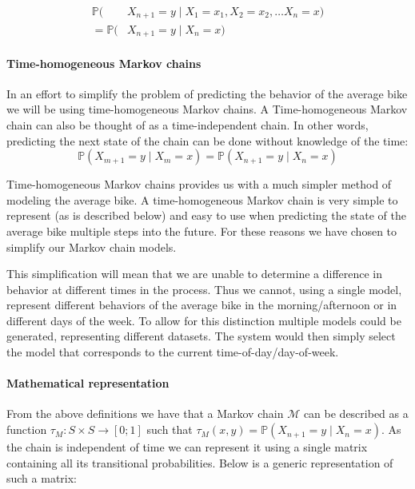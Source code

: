 \begin{align}\label{markov:eq:markov_prob}
\mathbb{P}(&X_{n+1} = y \mid X_1 = x_1, X_2 = x_2, \dots X_n = x)\nonumber\\
= \mathbb{P}(&X_{n+1} = y \mid X_n = x)
\end{align}

\paragraph{Time-homogeneous Markov chains}
In an effort to simplify the problem of predicting the behavior of the average bike we will be using time-homogeneous Markov chains.
A Time-homogeneous Markov chain can also be thought of as a time-independent chain.
In other words, predicting the next state of the chain can be done without knowledge of the time:
\begin{equation}
\mathbb{P}(X_{m+1} = y \mid X_m = x) = \mathbb{P}(X_{n+1} = y \mid X_n = x)
\end{equation}

Time-homogeneous Markov chains provides us with a much simpler method of modeling the average bike.
A time-homogeneous Markov chain is very simple to represent (as is described below) and easy to use when predicting the state of the average bike multiple steps into the future.
For these reasons we have chosen to simplify our Markov chain models.

This simplification will mean that we are unable to determine a difference in behavior at different times in the process.
Thus we cannot, using a single model, represent different behaviors of the average bike in the morning/afternoon or in different days of the week.
To allow for this distinction multiple models could be generated, representing different datasets.
The system would then simply select the model that corresponds to the current time-of-day/day-of-week.

\paragraph{Mathematical representation}\label{markov:math}
From the above definitions we have that a Markov chain $\mathcal{M}$ can be described as a function $\tau_M:S\times S \rightarrow [0;1]$ such that $\tau_M(x, y) = \mathbb{P}(X_{n + 1} = y \mid X_n = x)$.
As the chain is independent of time we can represent it using a single matrix containing all its transitional probabilities.
Below is a generic representation of such a matrix:

